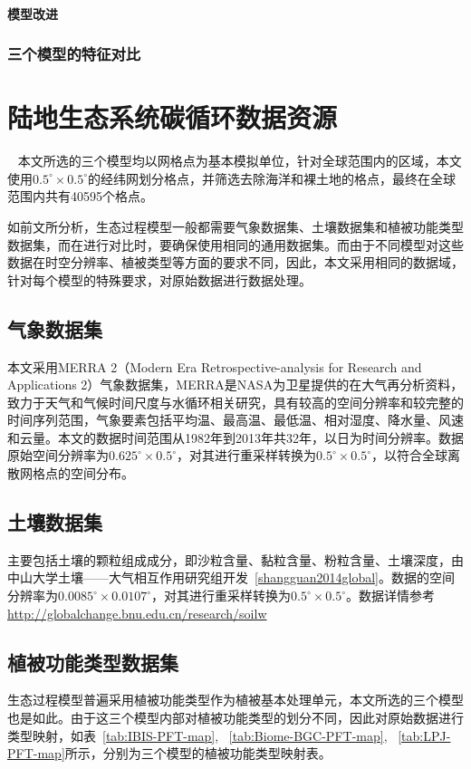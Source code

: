 \paragraph{模型改进} 

\subsubsection{三个模型的特征对比}

\section{陆地生态系统碳循环数据资源}
~\label{sec:model-data}
本文所选的三个模型均以网格点为基本模拟单位，针对全球范围内的区域，本文使用$0.5^{\circ} \times 0.5^{\circ}$的经纬网划分格点，并筛选去除海洋和裸土地的格点，最终在全球范围内共有40595个格点。

如前文所分析，生态过程模型一般都需要气象数据集、土壤数据集和植被功能类型数据集，而在进行对比时，要确保使用相同的通用数据集。而由于不同模型对这些数据在时空分辨率、植被类型等方面的要求不同，因此，本文采用相同的数据域，针对每个模型的特殊要求，对原始数据进行数据处理。

\subsection{气象数据集}
本文采用MERRA 2（Modern Era Retrospective-analysis for Research and Applications 2）气象数据集，MERRA是NASA为卫星提供的在大气再分析资料，致力于天气和气候时间尺度与水循环相关研究，具有较高的空间分辨率和较完整的时间序列范围，气象要素包括平均温、最高温、最低温、相对湿度、降水量、风速和云量。本文的数据时间范围从1982年到2013年共32年，以日为时间分辨率。数据原始空间分辨率为$0.625^{\circ} \times 0.5^{\circ}$，对其进行重采样转换为$0.5^{\circ} \times 0.5^{\circ}$，以符合全球离散网格点的空间分布。

\subsection{土壤数据集}
主要包括土壤的颗粒组成成分，即沙粒含量、黏粒含量、粉粒含量、土壤深度，由中山大学土壤——大气相互作用研究组开发~\ref{shangguan2014global}。数据的空间分辨率为$0.0085^{\circ} \times 0.0107^{\circ}$，对其进行重采样转换为$0.5^{\circ} \times 0.5^{\circ}$。数据详情参考 \href{http://globalchange.bnu.edu.cn/research/soilw}{http://globalchange.bnu.edu.cn/research/soilw}

\subsection{植被功能类型数据集}
生态过程模型普遍采用植被功能类型作为植被基本处理单元，本文所选的三个模型也是如此。由于这三个模型内部对植被功能类型的划分不同，因此对原始数据进行类型映射，如表~\ref{tab:IBIS-PFT-map}, ~\ref{tab:Biome-BGC-PFT-map}, ~\ref{tab:LPJ-PFT-map}所示，分别为三个模型的植被功能类型映射表。

